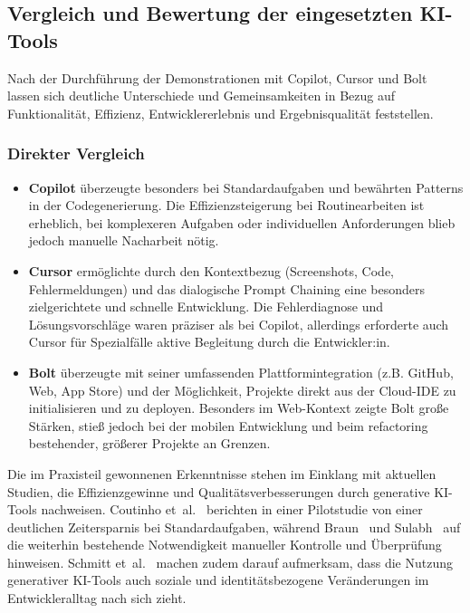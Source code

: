 \subsection{Vergleich und Bewertung der eingesetzten KI-Tools}

Nach der Durchführung der Demonstrationen mit Copilot, Cursor und Bolt lassen
sich deutliche Unterschiede und Gemeinsamkeiten in Bezug auf Funktionalität,
Effizienz, Entwicklererlebnis und Ergebnisqualität feststellen.

\subsubsection{Direkter Vergleich}

\begin{itemize}
      \item \textbf{Copilot} überzeugte besonders bei Standardaufgaben und bewährten Patterns in der Codegenerierung. Die Effizienzsteigerung bei Routinearbeiten ist erheblich, bei komplexeren Aufgaben oder individuellen Anforderungen blieb jedoch manuelle Nacharbeit nötig.
      \item \textbf{Cursor} ermöglichte durch den Kontextbezug (Screenshots, Code, Fehlermeldungen) und das dialogische Prompt Chaining eine besonders zielgerichtete und schnelle Entwicklung. Die Fehlerdiagnose und Lösungsvorschläge waren präziser als bei Copilot, allerdings erforderte auch Cursor für Spezialfälle aktive Begleitung durch die Entwickler:in.
      \item \textbf{Bolt} überzeugte mit seiner umfassenden Plattformintegration (z.B. GitHub, Web, App Store) und der Möglichkeit, Projekte direkt aus der Cloud-IDE zu initialisieren und zu deployen. Besonders im Web-Kontext zeigte Bolt große Stärken, stieß jedoch bei der mobilen Entwicklung und beim refactoring bestehender, größerer Projekte an Grenzen.
\end{itemize}

Die im Praxisteil gewonnenen Erkenntnisse stehen im Einklang mit aktuellen
Studien, die Effizienzgewinne und Qualitätsverbesserungen durch generative
KI-Tools nachweisen. Coutinho et~al.~\cite{coutinho_role_2024} berichten in
einer Pilotstudie von einer deutlichen Zeitersparnis bei Standardaufgaben,
während Braun~\cite{braun_ki_2024} und Sulabh~\cite{s_future_2024} auf die
weiterhin bestehende Notwendigkeit manueller Kontrolle und Überprüfung
hinweisen. Schmitt et~al.~\cite{schmitt_generative_2024} machen zudem darauf
aufmerksam, dass die Nutzung generativer KI-Tools auch soziale und
identitätsbezogene Veränderungen im Entwickleralltag nach sich zieht.

